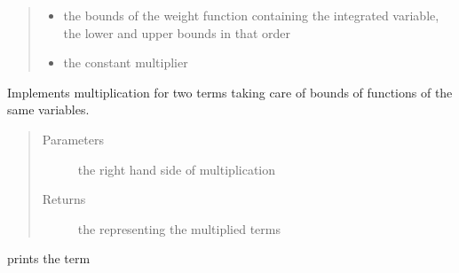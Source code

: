 \documentclass[letterpaper,10pt,english,openany,oneside]{sphinxmanual}
\begin{document}
\begin{fulllineitems}
\begin{fulllineitems}
\begin{quote}
\begin{description}
\begin{itemize}
\item {} 
 \textendash{} the bounds of the weight function containing the integrated variable, the lower and upper bounds in that order

\item {} 
 \textendash{} the constant multiplier

\end{itemize}

\end{description}\end{quote}

\end{fulllineitems}


\begin{fulllineitems}
\label{\detokenize{index:term.Term.__mul__}}
Implements multiplication for two terms taking care of bounds of functions of the same variables.
\begin{quote}\begin{description}
\item[{Parameters}] \leavevmode
{} \textendash{} the right hand side {\hyperref[\detokenize{index:term.Term}]{}} of multiplication

\item[{Returns}] \leavevmode
the {\hyperref[\detokenize{index:term.Term}]{}} representing the multiplied terms

\end{description}\end{quote}

\end{fulllineitems}


\begin{fulllineitems}
\label{\detokenize{index:term.Term.__str__}}
prints the term

\end{fulllineitems}


\end{fulllineitems}
\end{document}
